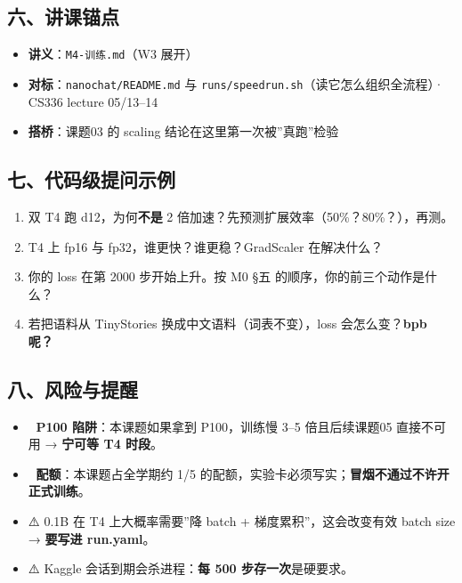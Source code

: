 \documentclass[
  chinese,
  11pt,
]{ctexart}
\providecommand{\tightlist}{%
  \setlength{\itemsep}{0pt}\setlength{\parskip}{0pt}}
\begin{document}
\subsection{六、讲课锚点}\label{ux516dux8bb2ux8bfeux951aux70b9-1}

\begin{itemize}
\tightlist
\item
  \textbf{讲义}：\texttt{M4-训练.md}（W3 展开）
\item
  \textbf{对标}：\texttt{nanochat/README.md} 与 \texttt{runs/speedrun.sh}（读它怎么组织全流程）· CS336 lecture 05/13--14
\item
  \textbf{搭桥}：课题03 的 scaling 结论在这里第一次被''真跑''检验
\end{itemize}

\subsection{七、代码级提问示例}\label{ux4e03ux4ee3ux7801ux7ea7ux63d0ux95eeux793aux4f8b-1}

\begin{enumerate}
\def\labelenumi{\arabic{enumi}.}
\tightlist
\item
  双 T4 跑 d12，为何\textbf{不是} 2 倍加速？先预测扩展效率（50\%？80\%？），再测。
\item
  T4 上 fp16 与 fp32，谁更快？谁更稳？GradScaler 在解决什么？
\item
  你的 loss 在第 2000 步开始上升。按 M0 §五 的顺序，你的前三个动作是什么？
\item
  若把语料从 TinyStories 换成中文语料（词表不变），loss 会怎么变？\textbf{bpb 呢？}
\end{enumerate}

\subsection{八、风险与提醒}\label{ux516bux98ceux9669ux4e0eux63d0ux9192-2}

\begin{itemize}
\tightlist
\item
  🚨 \textbf{P100 陷阱}：本课题如果拿到 P100，训练慢 3--5 倍且后续课题05 直接不可用 → \textbf{宁可等 T4 时段}。
\item
  🚨 \textbf{配额}：本课题占全学期约 1/5 的配额，实验卡必须写实；\textbf{冒烟不通过不许开正式训练}。
\item
  ⚠️ 0.1B 在 T4 上大概率需要''降 batch + 梯度累积''，这会改变有效 batch size → \textbf{要写进 run.yaml}。
\item
  ⚠️ Kaggle 会话到期会杀进程：\textbf{每 500 步存一次}是硬要求。
\end{itemize}
\end{document}
